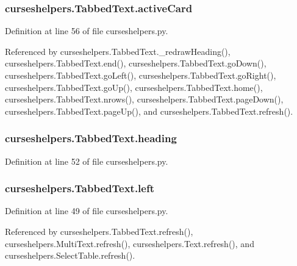 \subsubsection[{active\-Card}]{\setlength{\rightskip}{0pt plus 5cm}curseshelpers.\-Tabbed\-Text.\-active\-Card}\label{classcurseshelpers_1_1TabbedText_a4b7f6d73feca48188abffff0dfb447b4}


Definition at line 56 of file curseshelpers.\-py.



Referenced by curseshelpers.\-Tabbed\-Text.\-\_\-redraw\-Heading(), curseshelpers.\-Tabbed\-Text.\-end(), curseshelpers.\-Tabbed\-Text.\-go\-Down(), curseshelpers.\-Tabbed\-Text.\-go\-Left(), curseshelpers.\-Tabbed\-Text.\-go\-Right(), curseshelpers.\-Tabbed\-Text.\-go\-Up(), curseshelpers.\-Tabbed\-Text.\-home(), curseshelpers.\-Tabbed\-Text.\-nrows(), curseshelpers.\-Tabbed\-Text.\-page\-Down(), curseshelpers.\-Tabbed\-Text.\-page\-Up(), and curseshelpers.\-Tabbed\-Text.\-refresh().

\subsubsection[{heading}]{\setlength{\rightskip}{0pt plus 5cm}curseshelpers.\-Tabbed\-Text.\-heading}\label{classcurseshelpers_1_1TabbedText_a4684c498d6ff08fd96a94ecaf472d20a}


Definition at line 52 of file curseshelpers.\-py.

\subsubsection[{left}]{\setlength{\rightskip}{0pt plus 5cm}curseshelpers.\-Tabbed\-Text.\-left}\label{classcurseshelpers_1_1TabbedText_ac2952af217f6e87bccb6a3f2666f08c7}


Definition at line 49 of file curseshelpers.\-py.



Referenced by curseshelpers.\-Tabbed\-Text.\-refresh(), curseshelpers.\-Multi\-Text.\-refresh(), curseshelpers.\-Text.\-refresh(), and curseshelpers.\-Select\-Table.\-refresh().

